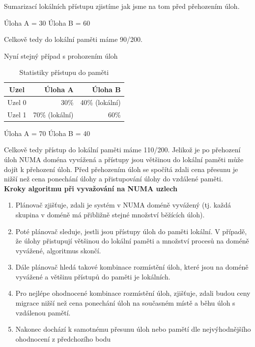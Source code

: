 \documentclass[
  master=true,
  font=sans,
  printversion=false,
  joinlists=true,
  figures=true,
  tables=true,
  sourcecodes=false,
  theorems=false,
  bibencoding=utf8,
  language=czech,
  encoding=utf8,
  field=ainfk,
  biblatex,
  glossaries,
  index
]{kidiplom}
\begin{document}
\noindent
Sumarizací lokálních přístupu zjistíme jak jsme na tom před přehozením úloh.

\noindent
Úloha A = 30
Úloha B = 60

\noindent
Celkově tedy do lokální paměti máme 90/200.

\noindent
Nyní stejný případ s prohozením úloh

\begin{table}[h]
\centering
\begin{tabular}{|c|r|r|}
\hline
Uzel & Úloha A & Úloha B \\
\hline
Uzel 0 & 30\% & 40\% (lokální)\\
\hline
Uzel 1 & 70\% (lokální) & 60\% \\
\hline
\end{tabular}
\caption{Statistiky přístupu do paměti}
\label{table6}
\end{table}

\noindent
Úloha A = 70
Úloha B = 40

\noindent
Celkově tedy přístup do lokální paměti máme 110/200. Jelikož je po přehození úloh NUMA doména vyvážená a přístupy jsou většinou do lokální paměti může dojít k přehození úloh. Před přehozením úloh se spočítá zdali cena přesunu je nižší než cena ponechání úlohy a přistupování úlohy do vzdálené paměti. \\

\newpage
\noindent
\textbf{Kroky algoritmu při vyvažování na NUMA uzlech}
\begin{enumerate}
\item Plánovač zjišťuje, zdali je systém v NUMA doméně vyvážený (tj. každá skupina v doméně má přibližně stejné množství běžících úloh).
\item Poté plánovač sleduje, jestli jsou přístupy úloh do paměti lokální. V případě, že úlohy přistupují většinou do lokální paměti a množství procesů na doméně vyvážené, algoritmus skončí. 
\item Dále plánovač hledá takové kombinace rozmístění úloh, které jsou na doméně vyvážené a většinu přístupů do paměti je lokálních.
\item Pro nejlépe ohodnocené kombinace rozmístění úloh, zjišťuje, zdali budou ceny migrace nižší než cena ponechání úloh na současném místě a běhu úloh s vzdálenou pamětí.
\item Nakonec dochází k samotnému přesunu úloh nebo pamětí dle nejvýhodnějšího ohodnocení z předchozího bodu
\end{enumerate}
\end{document}
